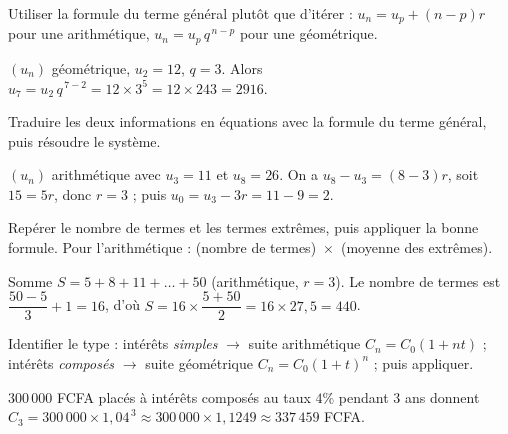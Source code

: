 Utiliser la formule du terme général plutôt que d'itérer : $u_n=u_p+(n-p)r$ pour une
arithmétique, $u_n=u_p\,q^{\,n-p}$ pour une géométrique.
\begin{exemple}
$(u_n)$ géométrique, $u_2=12$, $q=3$. Alors $u_7=u_2\,q^{\,7-2}=12\times 3^5=12\times 243=2916$.
\end{exemple}

Traduire les deux informations en équations avec la formule du terme général, puis
résoudre le système.
\begin{exemple}
$(u_n)$ arithmétique avec $u_3=11$ et $u_8=26$. On a $u_8-u_3=(8-3)r$, soit $15=5r$,
donc $r=3$ ; puis $u_0=u_3-3r=11-9=2$.
\end{exemple}

Repérer le nombre de termes et les termes extrêmes, puis appliquer la bonne formule.
Pour l'arithmétique : (nombre de termes)~$\times$~(moyenne des extrêmes).
\begin{exemple}
Somme $S=5+8+11+\dots+50$ (arithmétique, $r=3$). Le nombre de termes est
$\dfrac{50-5}{3}+1=16$, d'où $S=16\times\dfrac{5+50}{2}=16\times 27{,}5=440$.
\end{exemple}

Identifier le type : intérêts \emph{simples} $\to$ suite arithmétique $C_n=C_0(1+nt)$ ;
intérêts \emph{composés} $\to$ suite géométrique $C_n=C_0(1+t)^n$ ; puis appliquer.
\begin{exemple}
$300\,000$ FCFA placés à intérêts composés au taux $4\%$ pendant $3$ ans donnent
$C_3=300\,000\times 1{,}04^{\,3}\approx 300\,000\times 1{,}1249\approx 337\,459$ FCFA.
\end{exemple}
